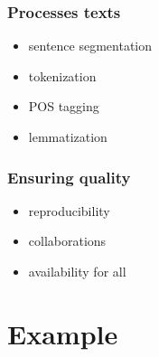 \documentclass{beamer}
\begin{document}
\begin{frame}
\frametitle{Processes texts}
\begin{itemize}
    \item sentence segmentation
    \item tokenization
    \item POS tagging
    \item lemmatization
    
\end{itemize}
\end{frame}

\begin{frame}
\frametitle{Ensuring quality}

\begin{itemize}
    \item reproducibility
    \item collaborations
    \item availability for all
    
\end{itemize}

\end{frame}

\section{Example}
\begin{frame}
\frametitle{}


\end{frame}

\begin{frame}
\frametitle{}


\end{frame}


\begin{frame}
\frametitle{}


\end{frame}


\begin{frame}
\frametitle{}


\end{frame}


\begin{frame}
\frametitle{}


\end{frame}


\begin{frame}
\frametitle{}


\end{frame}




 
\end{document}
